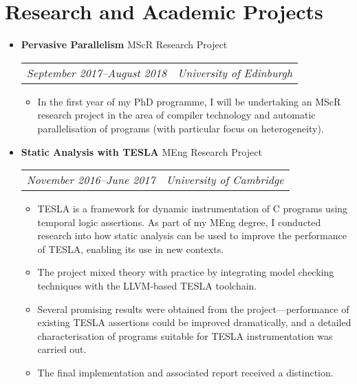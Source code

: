 \documentclass[letterpaper]{article}
\begin{document}
\section*{Research and Academic Projects}
  \begin{itemize}
    \item \textbf{Pervasive Parallelism} MScR Research Project \\
      \begin{tabular}{c|c}
        \emph{September 2017--August 2018} & \emph{University of Edinburgh}
      \end{tabular}
      \begin{itemize}
        \item In the first year of my PhD programme, I will be undertaking an
          MScR research project in the area of compiler technology and automatic
          parallelisation of programs (with particular focus on heterogeneity).
      \end{itemize}
    \item \textbf{Static Analysis with TESLA} MEng Research Project \\
      \begin{tabular}{c|c}
        \emph{November 2016--June 2017} & \emph{University of Cambridge}
      \end{tabular}
      \begin{itemize}
        \item TESLA is a framework for dynamic instrumentation of C programs
          using temporal logic assertions. As part of my MEng degree, I
          conducted research into how static analysis can be used to improve the
          performance of TESLA, enabling its use in new contexts.

        \item The project mixed theory with practice by integrating model
          checking techniques with the LLVM-based TESLA toolchain.

        \item Several promising results were obtained from the
          project---performance of existing TESLA assertions could be improved
          dramatically, and a detailed characterisation of programs suitable for
          TESLA instrumentation was carried out.

        \item The final implementation and associated report received a
          distinction.
      \end{itemize}


\end{itemize}
\end{document}
